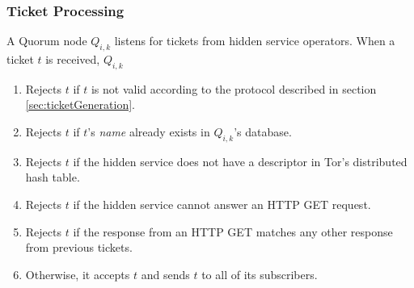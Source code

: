 \documentclass[USenglish,oneside,twocolumn]{article}
\begin{document}




\subsubsection{Ticket Processing} %

A Quorum node $ Q_{i,k} $ listens for tickets from hidden service operators. When a ticket $ t $ is received, $ Q_{i,k} $

\begin{enumerate}
	\item Rejects $ t $ if $ t $ is not valid according to the protocol described in section \ref{sec:ticketGeneration}.
	\item Rejects $ t $ if $ t $'s \emph{name} already exists in $ Q_{i,k} $'s database.
	\item Rejects $ t $ if the hidden service does not have a descriptor in Tor's distributed hash table.
	\item Rejects $ t $ if the hidden service cannot answer an HTTP GET request.
	\item Rejects $ t $ if the response from an HTTP GET matches any other response from previous tickets.
	\item Otherwise, it accepts $ t $ and sends $ t $ to all of its subscribers.
\end{enumerate}
\end{document}
